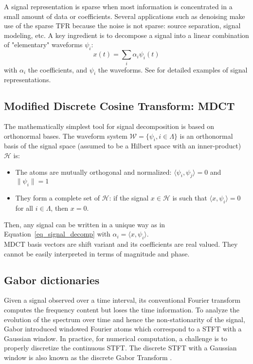 A signal representation is sparse when most information is concentrated in a small amount of data or coefficients. Several applications such as denoising make use of the sparse TFR because the noise is not sparse: source separation, signal modeling, etc. A key ingredient is to decompose a signal into a linear combination of "elementary" waveforms $\psi_{i}$:
\begin{equation}\label{eq_signal_decomp}
x(t) = \sum_i\alpha_i\psi_i(t)
\end{equation}
with $\alpha_i$ the coefficients, and $\psi_i$ the waveforms. See \cite{mallat2008wavelet,hlawatsch1992linear,wickerhauser1994adapted} for detailed examples of signal representations.\\

\subsection{Modified Discrete Cosine Transform: MDCT} \label{section:mdct}
The mathematically simplest tool for signal decomposition is based on orthonormal bases. The waveform system $\mathcal{W}=\{\psi_i, i \in\Lambda\}$ is an orthonormal basis of the signal space (assumed to be a Hilbert space with an inner-product) $\mathcal{H}$ is:
\begin{itemize}
\item The atoms are mutually orthogonal and normalized: $\langle\psi_i,\psi_j\rangle = 0$ and $\|\psi_i\|=1$
\item They form a complete set of $\mathcal{H}$: if the signal $x\in\mathcal{H}$ is such that $\langle x,\psi_i\rangle=0$ for all $i\in\Lambda$, then $x=0$.
\end{itemize}
Then, any signal can be written in a unique way as in Equation~\eqref{eq_signal_decomp} with $\alpha_i=\langle x,\psi_i\rangle$.\\

MDCT basis vectors are shift variant and its coefficients are real valued. They cannot be easily interpreted in terms of magnitude and phase.

\subsection{Gabor dictionaries} \label{section:gabor}
Given a signal observed over a time interval, its conventional Fourier transform computes the frequency content but loses the time information. To analyze the evolution of the spectrum over time and hence the non-stationarity of the signal, Gabor introduced windowed Fourier atoms which correspond to a \ac{STFT} with a Gaussian window. In practice, for numerical computation, a challenge is to properly discretize the continuous STFT. The discrete STFT with a Gaussian window is also known as the discrete Gabor Transform \cite{gabor1946theory}.

